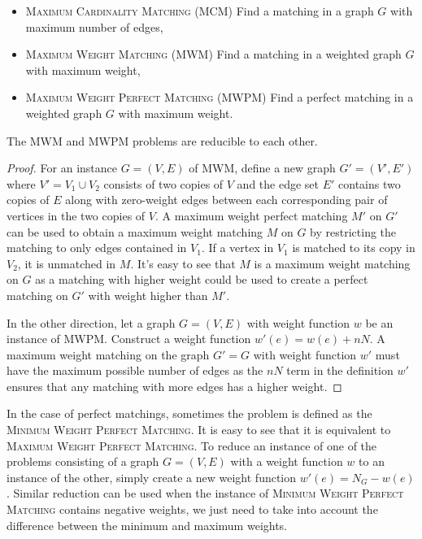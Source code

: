 \begin{itemize}
    \item \textsc{Maximum Cardinality Matching} (\textsc{MCM}) Find a matching in a graph $G$ with maximum number of edges,
    \item \textsc{Maximum Weight Matching} (\textsc{MWM}) Find a matching in a weighted graph $G$ with maximum weight,
    \item \textsc{Maximum Weight Perfect Matching} (\textsc{MWPM}) Find a perfect matching in a weighted graph $G$ with maximum weight.
\end{itemize}

\begin{theorem}\label{thm:reduction}
The \textsc{MWM} and \textsc{MWPM} problems are reducible to each other.

\begin{proof}
    For an instance $G=(V, E)$ of \textsc{MWM}, define a new graph $G' = (V', E')$ where $V' = V_1 \cup V_2$ consists of two copies of $V$ and the edge set $E'$ contains two copies of $E$ along with zero-weight edges between each corresponding pair of vertices in the two copies of $V$. A maximum weight perfect matching $M'$ on $G'$ can be used to obtain a maximum weight matching $M$ on $G$ by restricting the matching to only edges contained in $V_1$. If a vertex in $V_1$ is matched to its copy in $V_2$, it is unmatched in $M$. It's easy to see that $M$ is a maximum weight matching on $G$ as a matching with higher weight could be used to create a perfect matching on $G'$ with weight higher than $M'$. 
    
    In the other direction, let a graph $G=(V, E)$ with weight function $w$ be an instance of \textsc{MWPM}. Construct a weight function $w'(e) = w(e) + nN$. A maximum weight matching on the graph $G' = G$ with weight function $w'$ must have the maximum possible number of edges as the $nN$ term in the definition $w'$ ensures that any matching with more edges has a higher weight.    
\end{proof}
\end{theorem}

In the case of perfect matchings, sometimes the problem is defined as the \textsc{Minimum Weight Perfect Matching}. It is easy to see that it is equivalent to \textsc{Maximum Weight Perfect Matching}. To reduce an instance of one of the problems consisting of a graph $G = (V, E)$ with a weight function $w$ to an instance of the other, simply create a new weight function $w'(e) = N_G - w(e)$. Similar reduction can be used when the instance of \textsc{Minimum Weight Perfect Matching} contains negative weights, we just need to take into account the difference between the minimum and maximum weights.
